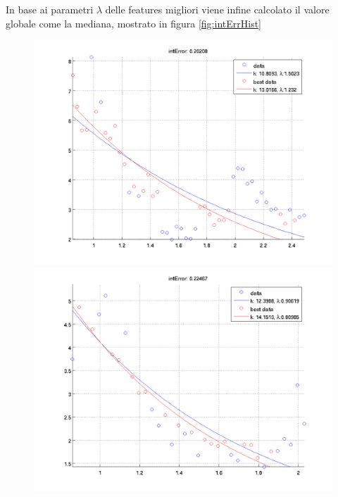 \documentclass[12pt]{report}
\begin{document}
\noindent In base ai parametri $\lambda$ delle features migliori viene infine calcolato il valore globale come la mediana, mostrato in figura \ref{fig:intErrHist}

\newcommand{\imFeatBW}{.48}
\begin{figure}[H]
\begin{minipage}[t]{0.5\linewidth}
	\centering
	\includegraphics[scale=\imFeatBW]{images/best1}\\
	\includegraphics[scale=\imFeatBW]{images/best3}\\

\end{minipage}
\end{figure}
\end{document}
